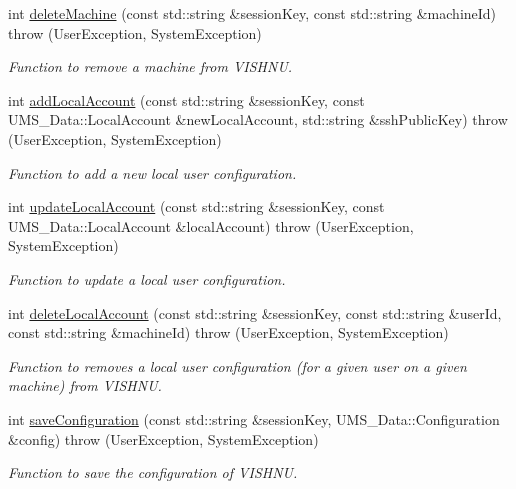 \begin{DoxyCompactItemize}
int \hyperlink{namespacevishnu_abdd14f47db308fc03655149ac7d93199}{deleteMachine} (const std::string \&sessionKey, const std::string \&machineId)  throw (UserException, SystemException)
\begin{DoxyCompactList}\small\item\em Function to remove a machine from VISHNU. \item\end{DoxyCompactList}\item 
int \hyperlink{namespacevishnu_ab54431ee8c1616ae24b071e9146d39e9}{addLocalAccount} (const std::string \&sessionKey, const UMS\_\-Data::LocalAccount \&newLocalAccount, std::string \&sshPublicKey)  throw (UserException, SystemException)
\begin{DoxyCompactList}\small\item\em Function to add a new local user configuration. \item\end{DoxyCompactList}\item 
int \hyperlink{namespacevishnu_ac51341ab58c1ed606b254262fbc053dc}{updateLocalAccount} (const std::string \&sessionKey, const UMS\_\-Data::LocalAccount \&localAccount)  throw (UserException, SystemException)
\begin{DoxyCompactList}\small\item\em Function to update a local user configuration. \item\end{DoxyCompactList}\item 
int \hyperlink{namespacevishnu_a2b51028779571b21c45a2a75cd362c59}{deleteLocalAccount} (const std::string \&sessionKey, const std::string \&userId, const std::string \&machineId)  throw (UserException, SystemException)
\begin{DoxyCompactList}\small\item\em Function to removes a local user configuration (for a given user on a given machine) from VISHNU. \item\end{DoxyCompactList}\item 
int \hyperlink{namespacevishnu_a2ecc54aee4da202b1caa94dfa6a43d17}{saveConfiguration} (const std::string \&sessionKey, UMS\_\-Data::Configuration \&config)  throw (UserException, SystemException)
\begin{DoxyCompactList}\small\item\em Function to save the configuration of VISHNU. \item\end{DoxyCompactList}\item 

\end{DoxyCompactItemize}
